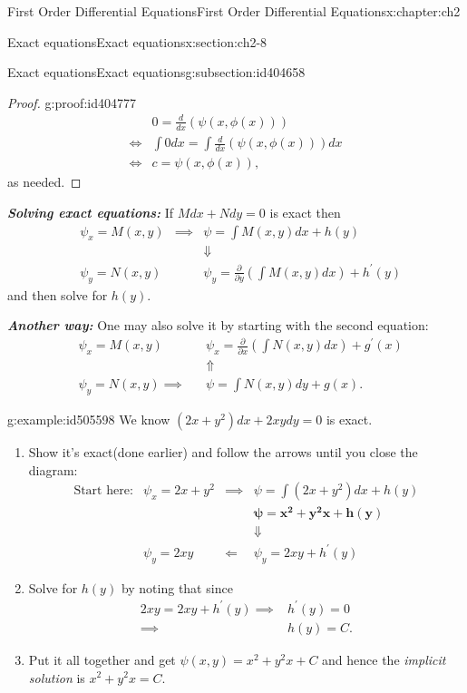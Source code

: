 \documentclass[oneside,10pt,]{book}
\newcommand{\alert}[1]{\textbf{\textit{#1}}}
\numberwithin{equation}{section}
\numberwithin{equation}{section}
\newcommand{\amp}{&}
\begin{document}
\begin{chapterptx}{First Order Differential Equations}{}{First Order Differential Equations}{}{}{x:chapter:ch2}
\begin{sectionptx}{Exact equations}{}{Exact equations}{}{}{x:section:ch2-8}
\begin{subsectionptx}{Exact equations}{}{Exact equations}{}{}{g:subsection:id404658}
\begin{proof}{}{g:proof:id404777}
\begin{align*}
\amp 0 =\frac{d}{dx}\left(\psi\left(x,\phi(x)\right)\right) \\
\iff\amp \int0dx=\int\frac{d}{dx}\left(\psi\left(x,\phi(x)\right)\right)dx\\
\iff \amp c=\psi\left(x,\phi(x)\right),
\end{align*}
as needed.\end{proof}
\alert{Solving exact equations:} If \(Mdx+Ndy=0\) is exact then%
\begin{align*}
\amp \psi_{x}=M(x,y) \amp \implies \amp \psi=\int M(x,y)dx+h(y)\\
\amp \amp \amp \Downarrow\\
\amp \psi_{y}=N(x,y) \amp \amp \psi_{y}=\frac{\partial}{\partial y}\left(\int M(x,y)dx\right)+h^{\prime}(y)
\end{align*}
and then solve for \(h(y)\).%
\par
\alert{Another way:} One may also solve it by starting with the second equation:%
\begin{align*}
\amp \psi_{x}=M(x,y) \amp \amp \psi_{x}=\frac{\partial}{\partial x}\left(\int N(x,y)dx\right)+g^{\prime}(x)\\
\amp \amp \amp \Uparrow\\
\amp\psi_{y}=N(x,y)\implies \amp \amp\psi=\int N(x,y)dy+g(x).
\end{align*}
%
\begin{example}{}{g:example:id505598}%
We know \(\left(2x+y^{2}\right)dx+2xydy=0\) is exact.%
\begin{enumerate}
\item{}Show it's exact(done earlier) and follow the arrows until you close the diagram:%
\begin{align*}
\text{Start here:} \amp \psi_{x}=2x+y^{2} \amp \implies \amp \psi=\int\left(2x+y^{2}\right)dx+h(y)\\
\amp  \amp  \amp \boldsymbol{\psi=x^{2}+y^{2}x+h(y)}\\
\amp  \amp  \amp \Downarrow\\
\amp \psi_{y}=2xy \amp \Longleftarrow \amp \psi_{y}=2xy+h^{\prime}(y)
\end{align*}
%
\item{}Solve for \(h(y)\) by noting that since%
\begin{align*}
2xy=2xy+h^{\prime}(y)\implies \amp h^{\prime}(y)=0\\
\implies \amp h(y)=C.
\end{align*}
%
\item{}Put it all together and get \(\psi(x,y)=x^{2}+y^{2}x+C\) and hence the \emph{implicit solution} is \(x^{2}+y^{2}x=C.\)%

\end{enumerate}
\end{example}
\end{subsectionptx}
\end{sectionptx}
\end{chapterptx}
\end{document}
